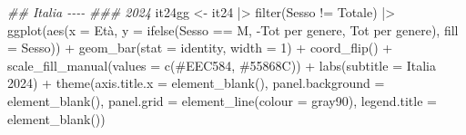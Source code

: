 \documentclass[
]{article}
\newenvironment{Shaded}{\begin{snugshade}}{\end{snugshade}}
\newcommand{\AttributeTok}[1]{\textcolor[rgb]{0.40,0.45,0.13}{#1}}
\newcommand{\DecValTok}[1]{\textcolor[rgb]{0.68,0.00,0.00}{#1}}
\newcommand{\DocumentationTok}[1]{\textcolor[rgb]{0.37,0.37,0.37}{\textit{#1}}}
\newcommand{\FunctionTok}[1]{\textcolor[rgb]{0.28,0.35,0.67}{#1}}
\newcommand{\NormalTok}[1]{\textcolor[rgb]{0.00,0.23,0.31}{#1}}
\newcommand{\OtherTok}[1]{\textcolor[rgb]{0.00,0.23,0.31}{#1}}
\newcommand{\SpecialCharTok}[1]{\textcolor[rgb]{0.37,0.37,0.37}{#1}}
\newcommand{\StringTok}[1]{\textcolor[rgb]{0.13,0.47,0.30}{#1}}
\begin{document}
\begin{Shaded}
\begin{Highlighting}[]
\DocumentationTok{\#\# Italia {-}{-}{-}{-}}
\DocumentationTok{\#\#\# 2024}
\NormalTok{it24gg }\OtherTok{\textless{}{-}}\NormalTok{ it24 }\SpecialCharTok{|\textgreater{}} 
  \FunctionTok{filter}\NormalTok{(Sesso }\SpecialCharTok{!=} \StringTok{\textquotesingle{}Totale\textquotesingle{}}\NormalTok{) }\SpecialCharTok{|\textgreater{}}
  \FunctionTok{ggplot}\NormalTok{(}\FunctionTok{aes}\NormalTok{(}\AttributeTok{x =}\NormalTok{ Età,}
             \AttributeTok{y =} \FunctionTok{ifelse}\NormalTok{(Sesso }\SpecialCharTok{==} \StringTok{\textquotesingle{}M\textquotesingle{}}\NormalTok{,}
                        \SpecialCharTok{{-}}\StringTok{\textasciigrave{}}\AttributeTok{Tot per genere}\StringTok{\textasciigrave{}}\NormalTok{, }\StringTok{\textasciigrave{}}\AttributeTok{Tot per genere}\StringTok{\textasciigrave{}}\NormalTok{),}
             \AttributeTok{fill =}\NormalTok{ Sesso)) }\SpecialCharTok{+}
  \FunctionTok{geom\_bar}\NormalTok{(}\AttributeTok{stat =} \StringTok{\textquotesingle{}identity\textquotesingle{}}\NormalTok{, }\AttributeTok{width =} \DecValTok{1}\NormalTok{) }\SpecialCharTok{+}
  \FunctionTok{coord\_flip}\NormalTok{() }\SpecialCharTok{+}
  \FunctionTok{scale\_fill\_manual}\NormalTok{(}\AttributeTok{values =} \FunctionTok{c}\NormalTok{(}\StringTok{\textquotesingle{}\#EEC584\textquotesingle{}}\NormalTok{, }\StringTok{\textquotesingle{}\#55868C\textquotesingle{}}\NormalTok{)) }\SpecialCharTok{+}
  \FunctionTok{labs}\NormalTok{(}\AttributeTok{subtitle =} \StringTok{\textquotesingle{}Italia 2024\textquotesingle{}}\NormalTok{) }\SpecialCharTok{+}
  \FunctionTok{theme}\NormalTok{(}\AttributeTok{axis.title.x =} \FunctionTok{element\_blank}\NormalTok{(),}
        \AttributeTok{panel.background =} \FunctionTok{element\_blank}\NormalTok{(),}
        \AttributeTok{panel.grid =} \FunctionTok{element\_line}\NormalTok{(}\AttributeTok{colour =} \StringTok{\textquotesingle{}gray90\textquotesingle{}}\NormalTok{),}
        \AttributeTok{legend.title =} \FunctionTok{element\_blank}\NormalTok{())}
  

\end{Highlighting}
\end{Shaded}
\end{document}
